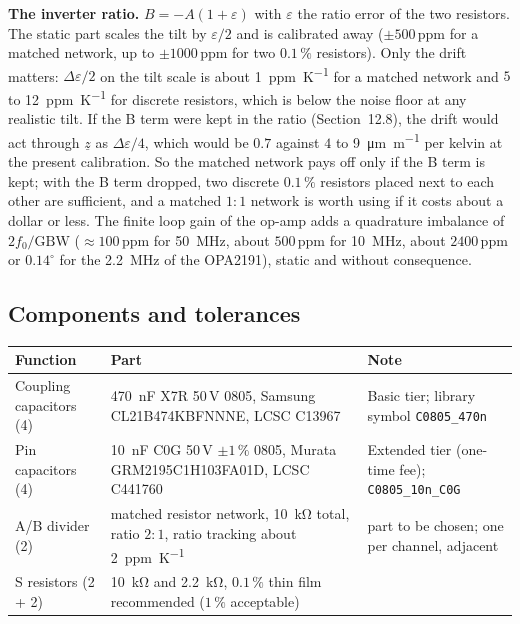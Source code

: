 \documentclass[11pt,a4paper]{article}
\begin{document}
\textbf{The inverter ratio.}  $B=-A(1+\varepsilon)$ with $\varepsilon$ the ratio error of the
two resistors.  The static part scales the tilt by $\varepsilon/2$ and is calibrated away
($\pm500$\,ppm for a matched network, up to $\pm1000$\,ppm for two $0.1\,\%$ resistors).  Only
the drift matters: $\Delta\varepsilon/2$ on the tilt scale is about \SI{1}{ppm\per\kelvin} for a
matched network and $5$ to \SI{12}{ppm\per\kelvin} for discrete resistors, which is below the
noise floor at any realistic tilt.  If the B term were kept in the ratio
(Section~12.8), the drift would act through $\underline{z}$ as $\Delta\varepsilon/4$, which would be
$0.7$ against $4$ to \SI{9}{\micro\metre\per\metre} per kelvin at the present calibration.  So the
matched network pays off only if the B term is kept; with the B term dropped, two discrete
$0.1\,\%$ resistors placed next to each other are sufficient, and a matched $1\!:\!1$ network is
worth using if it costs about a dollar or less.  The finite loop gain of the op-amp adds a
quadrature imbalance of $2f_0/\mathrm{GBW}$ ($\approx100$\,ppm for \SI{50}{\mega\hertz}, about
$500$\,ppm for \SI{10}{\mega\hertz}, about $2400$\,ppm or $0.14^{\circ}$ for the \SI{2.2}{\mega\hertz}
of the OPA2191), static and without consequence.

\subsection{Components and tolerances}

\begin{center}
\small
\begin{tabular}{@{}p{}p{}p{}@{}}
\toprule
Function & Part & Note \\
\midrule
Coupling capacitors (4) & \SI{470}{\nano\farad} X7R 50\,V 0805, Samsung CL21B474KBFNNNE,
  LCSC C13967 & Basic tier; library symbol \texttt{C0805\_470n} \\
Pin capacitors (4) & \SI{10}{\nano\farad} C0G 50\,V $\pm1\,\%$ 0805, Murata GRM2195C1H103FA01D,
  LCSC C441760 & Extended tier (one-time fee); \texttt{C0805\_10n\_C0G} \\
A/B divider (2) & matched resistor network, \SI{10}{\kilo\ohm} total, ratio $2\!:\!1$,
  ratio tracking about \SI{2}{ppm\per\kelvin} & part to be chosen; one per channel, adjacent \\
S resistors (2 + 2) & \SI{10}{\kilo\ohm} and \SI{2.2}{\kilo\ohm}, $0.1\,\%$ thin film
  recommended ($1\,\%$ acceptable) & \\
\bottomrule
\end{tabular}
\end{center}
\end{document}
